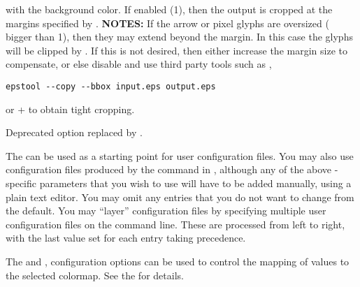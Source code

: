 \begin{description}
 with the background color.  If enabled (1), then the output is cropped
 at the margins specified by . \textbf{NOTES:} If the
 arrow or pixel glyphs are oversized ( bigger than 1), then
 they may extend beyond the margin. In this case the glyphs will be
 clipped by . If this is not desired, then either
 increase the margin size to compensate, or else disable
  and use third party tools such as ,
\begin{verbatim}
epstool --copy --bbox input.eps output.eps
\end{verbatim}
 or  +  to obtain tight cropping.
\item[\optkey{misc,crop}] Deprecated option replaced by .
\end{description}

The  can be used as a starting point for
user configuration files.  You may also use configuration files produced
by the  command in
, although any of the above
-specific parameters that you wish to use will have to be
added manually, using a plain text editor.  You may omit any entries
that you do not want to change from the default.  You may ``layer''
configuration files by specifying multiple user configuration files on
the command line.  These are processed from left to right, with the last
value set for each entry taking precedence.

The  and , 
configuration options can be used to control the mapping of values to
the selected colormap. See the
 for details.

